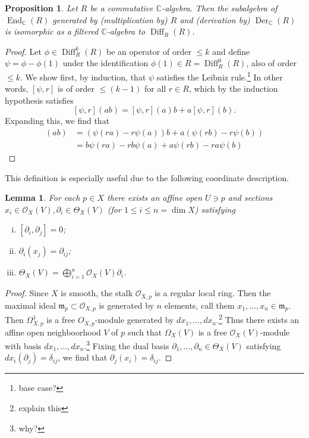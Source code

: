 \documentclass{article}
\newcommand{\C}{\mathbb{C}}
\newcommand{\fr}{\mathfrak}
\theoremstyle{plain}
\newtheorem{lemma}[theorem]{Lemma}
\newtheorem{proposition}[theorem]{Proposition}
\theoremstyle{definition}
\theoremstyle{remark}
\DeclareMathOperator{\Der}{Der}
\DeclareMathOperator{\End}{End}
\DeclareMathOperator{\Diff}{Diff}
\begin{document}
\begin{proposition}
    Let $R$ be a commutative $\C$-algebra. Then the subalgebra of $\End_\C(R)$ generated
    by (multiplication by) $R$ and (derivation by) $\Der_\C(R)$ is isomorphic as a filtered
    $\C$-algebra to $\Diff_R(R)$.
\end{proposition}
\begin{proof}
    Let $\phi\in\Diff^k_R(R)$ be an operator of order $\leqslant k$ and define $\psi=\phi-\phi(1)$
    under the identification $\phi(1)\in R=\Diff^0_R(R)$, also of order $\leqslant k$.
    We show first, by induction, that $\psi$ satisfies the Leibniz rule.\footnote{base case?}
    In other words, $[\psi, r]$ is of order $\leqslant (k-1)$ for all $r\in R$, which by the
    induction hypothesis satisfies 
    \[ [\psi,r](ab)=[\psi,r](a)b+a[\psi,r](b).  \]
    Expanding this, we find that
    \begin{align*}
        [\psi,r](ab) &= \left( \psi(ra)-r\psi(a) \right)b+a\left( \psi(rb)-r\psi(b) \right)\\
        &= b\psi(ra) - rb\psi(a) + a\psi(rb) - ra\psi(b)
    \end{align*}
\end{proof}

This definition is especially useful due to the following coordinate description.

\begin{lemma}
    For each $p\in X$ there exists an affine open $U\ni p$ and sections
    $x_i\in\mathcal{O}_X(V),\partial_i\in\Theta_X(V)$ (for $1\leq i\leq n=\dim X$) satisfying
    \begin{enumerate}[(i)]
        \item $[\partial_i,\partial_j]=0$;
        \item $\partial_i(x_j)=\partial_{ij}$;
        \item $\Theta_X(V)=\bigoplus_{i=1}^n\mathcal{O}_X(V)\partial_i$.
    \end{enumerate}
\end{lemma}
\begin{proof}
    Since $X$ is smooth, the stalk $\mathcal{O}_{X,p}$ is a regular local ring. Then the maximal
    ideal $\fr m_p\subset \mathcal{O}_{X,p}$ is generated by $n$ elements, call them
    $x_1,\ldots,x_n\in\fr m_p$. Then $\Omega^1_{X,p}$ is a free $O_{X,p}$-module generated
    by $dx_1,\ldots, dx_n$.\footnote{explain this} Thus there exists an affine open neighboorhood
    $V$ of $p$ such that $\Omega_X(V)$ is a free $\mathcal{O}_X(V)$-module with basis
    $dx_1,\ldots,dx_n$.\footnote{why?} Fixing the dual basis $\partial_1,\ldots,\partial_n\in\Theta_X(V)$
    satisfying $dx_i(\partial_j)=\delta_{ij}$, we find that $\partial_j(x_i)=\delta_{ij}$.
\end{proof}
\end{document}
